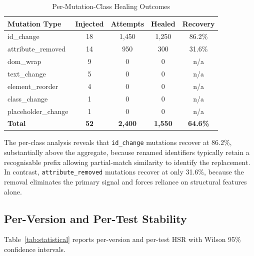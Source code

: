 \documentclass[12pt]{article}
\begin{document}
\begin{table}[H]
\centering
\caption{Per-Mutation-Class Healing Outcomes}
\label{tab:per_mutation}
\begin{tabular}{lcccc}
\toprule
Mutation Type & Injected & Attempts & Healed & Recovery \\
\midrule
id\_change & 18 & 1,450 & 1,250 & 86.2\% \\
attribute\_removed & 14 & 950 & 300 & 31.6\% \\
dom\_wrap & 9 & 0 & 0 & n/a \\
text\_change & 5 & 0 & 0 & n/a \\
element\_reorder & 4 & 0 & 0 & n/a \\
class\_change & 1 & 0 & 0 & n/a \\
placeholder\_change & 1 & 0 & 0 & n/a \\
\midrule
\textbf{Total} & \textbf{52} & \textbf{2,400} & \textbf{1,550} & \textbf{64.6\%} \\
\bottomrule
\end{tabular}
\end{table}

The per-class analysis reveals that \texttt{id\_change} mutations recover at 86.2\%, substantially above the aggregate, because renamed identifiers typically retain a recognisable prefix allowing partial-match similarity to identify the replacement. In contrast, \texttt{attribute\_removed} mutations recover at only 31.6\%, because the removal eliminates the primary signal and forces reliance on structural features alone.

\subsection{Per-Version and Per-Test Stability}

Table~\ref{tab:statistical} reports per-version and per-test HSR with Wilson 95\% confidence intervals.
\end{document}
